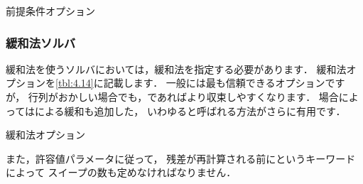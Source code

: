 \begin{table}[ht]
 
 \caption{前提条件オプション}
 \label{tbl:4.13}
\end{table}


\subsubsection{緩和法ソルバ}
\label{sssec:4.5.1.3}
緩和法を使うソルバにおいては，緩和法を指定する必要があります．
緩和法オプションを\autoref{tbl:4.14}に記載します．
一般には最も信頼できるオプションですが，
行列がおかしい場合でも，であればより収束しやすくなります．
場合によってはによる緩和も追加した，
いわゆると呼ばれる方法がさらに有用です．


\begin{table}[ht]
 
 \caption{緩和法オプション}
 \label{tbl:4.14}
\end{table}


また，許容値パラメータに従って，
残差が再計算される前にというキーワードによって
スイープの数も定めなければなりません．


